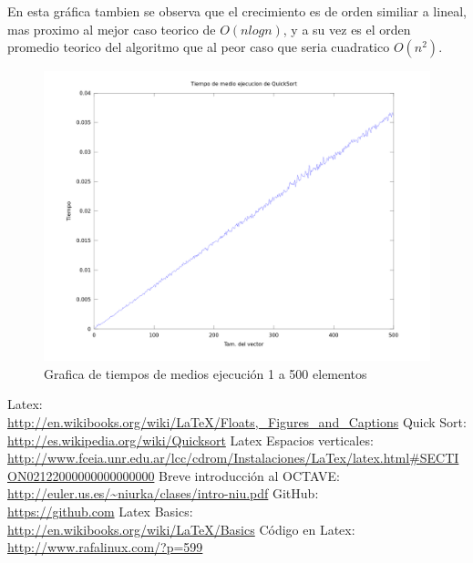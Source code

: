 \documentclass[a4,12pt]{article}
\begin{document}
En esta gráfica tambien se observa que el crecimiento es de orden similiar a lineal, mas proximo al mejor caso teorico de $O(nlogn)$, y a su vez es el orden promedio teorico del algoritmo que al peor caso que seria cuadratico $O(n^2)$.
\begin{figure}[h]
\includegraphics[width=1\textwidth]{Graficos/tiemposMedios}
\caption{Grafica de tiempos de medios ejecución 1 a 500 elementos}
\label{fig:tiemposMedios}
\end{figure}




\begin{thebibliography}{99}
 Latex:\\ \url{http://en.wikibooks.org/wiki/LaTeX/Floats,_Figures_and_Captions}
 Quick Sort:\\ \url{http://es.wikipedia.org/wiki/Quicksort}
 Latex Espacios verticales: \\ \url{http://www.fceia.unr.edu.ar/lcc/cdrom/Instalaciones/LaTex/latex.html#SECTION02122000000000000000}
 Breve introducción al OCTAVE: \\ \url{http://euler.us.es/~niurka/clases/intro-niu.pdf}
 GitHub: \\ \url{https://github.com}
 Latex Basics: \\ \url{http://en.wikibooks.org/wiki/LaTeX/Basics}
 Código en Latex: \\ \url{http://www.rafalinux.com/?p=599}

\end{thebibliography}
\end{document}

